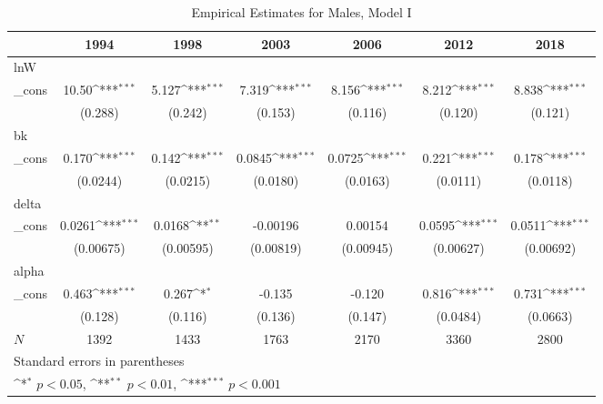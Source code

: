 \begin{table}[htbp]\centering
\def\sym#1{\ifmmode^{#1}\else\(^{#1}\)\fi}
\caption{Empirical Estimates for Males, Model I}
\begin{tabular}{l*{6}{c}}
\hline\hline
            &\multicolumn{1}{c}{1994}&\multicolumn{1}{c}{1998}&\multicolumn{1}{c}{2003}&\multicolumn{1}{c}{2006}&\multicolumn{1}{c}{2012}&\multicolumn{1}{c}{2018}\\
\hline
lnW         &                     &                     &                     &                     &                     &                     \\
\_cons      &       10.50\sym{***}&       5.127\sym{***}&       7.319\sym{***}&       8.156\sym{***}&       8.212\sym{***}&       8.838\sym{***}\\
            &     (0.288)         &     (0.242)         &     (0.153)         &     (0.116)         &     (0.120)         &     (0.121)         \\
\hline
bk          &                     &                     &                     &                     &                     &                     \\
\_cons      &       0.170\sym{***}&       0.142\sym{***}&      0.0845\sym{***}&      0.0725\sym{***}&       0.221\sym{***}&       0.178\sym{***}\\
            &    (0.0244)         &    (0.0215)         &    (0.0180)         &    (0.0163)         &    (0.0111)         &    (0.0118)         \\
\hline
delta       &                     &                     &                     &                     &                     &                     \\
\_cons      &      0.0261\sym{***}&      0.0168\sym{**} &    -0.00196         &     0.00154         &      0.0595\sym{***}&      0.0511\sym{***}\\
            &   (0.00675)         &   (0.00595)         &   (0.00819)         &   (0.00945)         &   (0.00627)         &   (0.00692)         \\
\hline
alpha       &                     &                     &                     &                     &                     &                     \\
\_cons      &       0.463\sym{***}&       0.267\sym{*}  &      -0.135         &      -0.120         &       0.816\sym{***}&       0.731\sym{***}\\
            &     (0.128)         &     (0.116)         &     (0.136)         &     (0.147)         &    (0.0484)         &    (0.0663)         \\
\hline
\(N\)       &        1392         &        1433         &        1763         &        2170         &        3360         &        2800         \\
\hline\hline
\multicolumn{7}{l}{\footnotesize Standard errors in parentheses}\\
\multicolumn{7}{l}{\footnotesize \sym{*} \(p<0.05\), \sym{**} \(p<0.01\), \sym{***} \(p<0.001\)}\\
\end{tabular}
\end{table}
